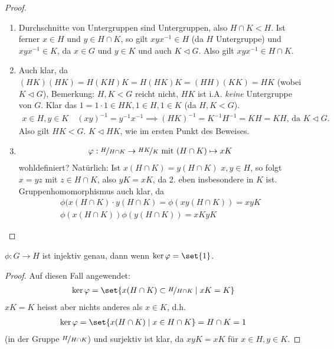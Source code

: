 \begin{proof}
	\begin{enumerate}
		\item Durchschnitte von Untergruppen sind Untergruppen, also $H \cap K < H$. Ist ferner $x \in H$ und $y \in H\cap K$, so gilt $xyx^{-1} \in H$ (da $H$ Untergruppe) und $xyx^{-1} \in K$, da $x \in G$ und $y \in K$ und auch $K \lhd G$. Also gilt $xyx^{-1} \in H \cap K$.
		\item Auch klar, da $(HK)(HK) = H(KH)K = H(HK)K = (HH)(KK) = HK$ (wobei $K \lhd G$), Bemerkung: $H,K < G$ reicht nicht, $HK$ ist i.A. \emph{keine} Untergruppe von $G$. Klar das $1 = 1\cdot 1 \in HK, 1 \in H, 1\in K$ (da $H,K < G$).
		\begin{align*}
			x \in H, y\in K\quad (xy)^{-1} = y^{-1}x^{-1} \implies (HK)^{-1} = K^{-1}H^{-1} = KH = KH\text{, da } K\lhd G.
		\end{align*}
		Also gilt $HK < G$. $K \lhd HK$, wie im ersten Punkt des Beweises.
		\item \begin{align*}
		\phi: \lnkset{H}{H \cap K} \to \lnkset{HK}{K} \mit (H \cap K) \mapsto xK
		\end{align*}
		wohldefiniert? Natürlich: Ist $x(H \cap K) = y (H\cap K)$ $x,y \in H$, so folgt $x = yz$ mit $z \in H \cap K$, also $yK = xK$, da 2. eben insbesondere in $K$ ist. Gruppenhomomorphismus auch klar, da
		\begin{align*}
			\phi(x(H \cap K) \cdot y(H \cap K) = \phi(xy(H \cap K)) = xyK\\
			\phi(x(H\cap K))\phi(y(H\cap K)) = xKyK
		\end{align*}
	\end{enumerate}
\end{proof}
\begin{lemma}
	$\phi: G \to H$ ist injektiv genau, dann wenn $\ker \phi = \set{1}$. 
\end{lemma}
\begin{proof}
	Auf diesen Fall angewendet:
	\begin{align*}
	\ker \phi = \set{x(H \cap K) \subset \lnkset{H}{H \cap K} \mid xK = K}
	\end{align*}
	$xK = K$ heisst aber nichts anderes als $x \in K$, d.h.
	\begin{align*}
	\ker \phi = \set{x(H \cap K) \mid x \in H \cap K} = H\cap K = 1
	\end{align*}
	(in der Gruppe $\lnkset{H}{H \cap K}$) und surjektiv ist klar, da $xyK = xK$ für $x \in H, y \in K$.
\end{proof}
